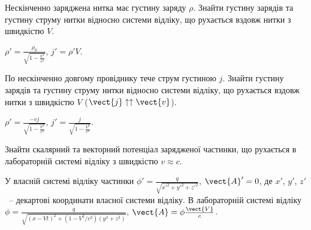 \begin{problem}
    Нескінченно заряджена нитка має густину заряду $\rho$. Знайти густину зарядів та густину струму нитки відносно системи відліку, що рухається вздовж нитки з швидкістю $V$. 
\begin{solution}
	$\rho' = \frac{\rho_0}{\sqrt{1 - \frac{V^2}{c^2}}}$, $j' = \rho' V$.
\end{solution}
\end{problem}

\begin{problem}
    По нескінченно довгому провіднику тече струм густиною $j$. Знайти густину зарядів та густину струму нитки відносно системи відліку, що рухається вздовж нитки з швидкістю $V$ ($\vect{j} \uparrow\uparrow \vect{v}$). 
\begin{solution}
	$\rho' = \frac{- v j}{\sqrt{1 - \frac{V^2}{c^2}}}$, $j' = \frac{j}{\sqrt{1 - \frac{V^2}{c^2}}}$.
\end{solution}
\end{problem}

\begin{problem}
    Знайти скалярний та векторний потенціал зарядженої частинки, що рухається в лабораторній системі відліку з швидкістю $v \approx c$. 
\begin{solution}
	У власній системі відліку частинки $\phi'  = \frac{q}{\sqrt{x'^2 + y'^2 + z'^2}}$, $\vect{A}' = 0$, де $x'$, $y'$, $z'$~-- декартові координати власної системи відліку.
	В лабораторній системі відліку $\phi = \frac{q}{\sqrt{(x - Vt)^2 + \left( 1 - V^2/c^2\right)(y^2 + z^2) }}$, $\vect{A} = \phi\frac{\vect{V}}{c}$.
\end{solution}
\end{problem}


